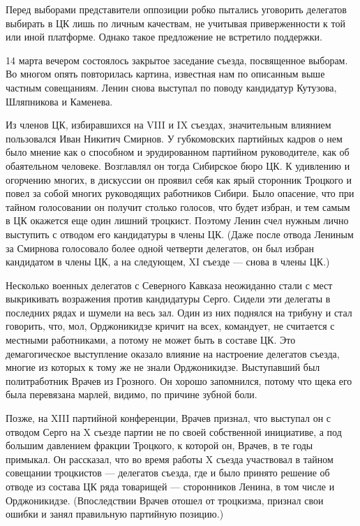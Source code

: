 \documentclass[12pt, a4paper, openany]{book}
\begin{document}
Перед выборами представители оппозиции робко пытались уговорить делегатов выбирать в ЦК лишь по личным качествам, не учитывая приверженности к той или иной платформе. Однако такое предложение не встретило поддержки.

14 марта вечером состоялось закрытое заседание съезда, посвященное выборам. Во многом опять повторилась картина, известная нам по описанным выше частным совещаниям. Ленин снова выступал по поводу кандидатур Кутузова, Шляпникова и Каменева.

Из членов ЦК, избиравшихся на VIII и IX съездах, значительным влиянием пользовался Иван Никитич Смирнов. У губкомовских партийных кадров о нем было мнение как о способном и эрудированном партийном руководителе, как об обаятельном человеке. Возглавлял он тогда Сибирское бюро ЦК. К удивлению и огорчению многих, в дискуссии он проявил себя как ярый сторонник Троцкого и повел за собой многих руководящих работников Сибири. Было опасение, что при тайном голосовании он получит столько голосов, что будет избран, и тем самым в ЦК окажется еще один лишний троцкист. Поэтому Ленин счел нужным лично выступить с отводом его кандидатуры в члены ЦК. (Даже после отвода Лениным за Смирнова голосовало более одной четверти делегатов, он был избран кандидатом в члены ЦК, а на следующем, XI съезде — снова в члены ЦК.)

Несколько военных делегатов с Северного Кавказа неожиданно стали с мест выкрикивать возражения против кандидатуры Серго. Сидели эти делегаты в последних рядах и шумели на весь зал. Один из них поднялся на трибуну и стал говорить, что, мол, Орджоникидзе кричит на всех, командует, не считается с местными работниками, а потому не может быть в составе ЦК. Это демагогическое выступление оказало влияние на настроение делегатов съезда, многие из которых к тому же не знали Орджоникидзе. Выступавший был политработник Врачев из Грозного. Он хорошо запомнился, потому что щека его была перевязана марлей, видимо, по причине зубной боли.

Позже, на XIII партийной конференции, Врачев признал, что выступал он с отводом Серго на X съезде партии не по своей собственной инициативе, а под большим давлением фракции Троцкого, к которой он, Врачев, в те годы примыкал. Он рассказал, что во время работы X съезда участвовал в тайном совещании троцкистов — делегатов съезда, где и было принято решение об отводе из состава ЦК ряда товарищей — сторонников Ленина, в том числе и Орджоникидзе. (Впоследствии Врачев отошел от троцкизма, признал свои ошибки и занял правильную партийную позицию.)
\end{document}
